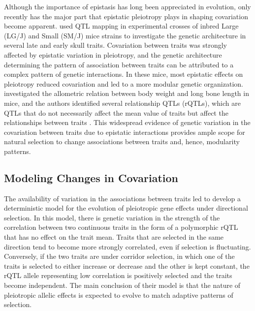 \begin{refsection}
Although the importance of epistasis has long been appreciated in
evolution, only recently has the major part that epistatic pleiotropy
plays in shaping covariation become apparent.
\textcite{Wolf2005-nr} used QTL mapping
in experimental crosses of inbred Large (LG/J) and Small (SM/J) mice
strains to investigate the genetic architecture in several late and
early skull traits. Covariation between traits was strongly affected by
epistatic variation in pleiotropy, and the genetic architecture
determining the pattern of association between traits can be attributed
to a complex pattern of genetic interactions. In these mice, most
epistatic effects on pleiotropy reduced covariation and led to a more
modular genetic organization. \textcite{Pavlicev2008-jy} investigated the allometric relation between body weight and long bone length in mice, and the authors identified several
relationship QTLs (rQTLs), which are QTLs that do not necessarily affect
the mean value of traits but affect the relationships between traits
\parencite{Wagner2007-cx}. This widespread
evidence of genetic variation in the covariation between traits due to
epistatic interactions provides ample scope for natural selection to
change associations between traits and, hence, modularity patterns.

\subsection{Modeling Changes in Covariation}

The availability of variation in the associations between traits led
\textcite{Pavlicev2011-wz} to develop a
deterministic model for the evolution of pleiotropic gene effects under
directional selection. In this model, there is genetic variation in the
strength of the correlation between two continuous traits in the form of
a polymorphic rQTL that has no effect on the trait mean. Traits that are
selected in the same direction tend to become more strongly correlated,
even if selection is fluctuating. Conversely, if the two traits are
under corridor selection, in which one of the traits is selected to
either increase or decrease and the other is kept constant, the rQTL
allele representing low correlation is positively selected and the
traits become independent. The main conclusion of their model is that
the nature of pleiotropic allelic effects is expected to evolve to match
adaptive patterns of selection.


\end{refsection}
